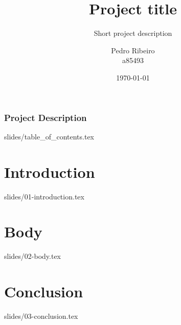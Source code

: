 \documentclass{beamer}
\title{Project title}
\begin{document}
\author[Pedro Ribeiro]{
    \parbox{2.5cm}{%
        \centering Pedro Ribeiro\\a85493
    }%
}


\subtitle{\tiny{Short project description}}


\date{\today}


\begin{frame}
    \frametitle{Project Description}
    \titlepage
\end{frame}

{slides/table_of_contents.tex}

\section{Introduction}
{slides/01-introduction.tex}

\section{Body}
{slides/02-body.tex}

\section{Conclusion}
{slides/03-conclusion.tex}
\end{document}
